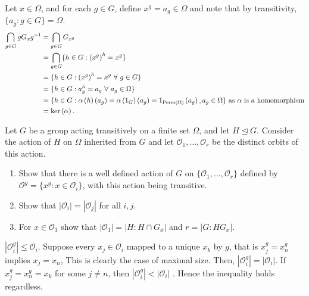 \documentclass[a4paper]{article}
\begin{document}
\begin{solution}
	Let \( x \in \Omega\), and for each \(g \in G\), define \(x^{g} = a_{g} \in \Omega\) and note that by transitivity, \(\{a_{g} : g \in G\}  = \Omega\).
\begin{align*}
\bigcap_{g \in G} gG_{x} g^{-1} &=  \bigcap_{g \in G}G_{x^{g}} \\
				&= \bigcap_{g \in G} \{h \in G : \left(x^{g} \right)^{h} = x^{g}\}   \\
				&=  \{h \in G : \left(x^{g} \right) ^{h} = x^{g} \ \forall \ g \in G\} \\
&=  \{h \in G : a_{g}^{h} = a_{g} \ \forall \ a_{g} \in \Omega\} \\
&=  \{h \in G : \alpha \left( h \right) \left( a_{g} \right)  = \alpha\left( 1_{G} \right) \left( a_{g} \right) = 1_{\perm (\Omega) } \left( a_{g} \right) , a_{g} \in \Omega \} \text{ as \(\alpha\) is a homomorphism} \\
&= \ker \left( \alpha \right)
.\end{align*}
\end{solution}
\newpage
\begin{problem}[4]
	Let \(G\) be a group acting transitively on a finite set \(\Omega\), and let \(H \trianglelefteq G\). Consider the action of \(H\) on \(\Omega\) inherited from \(G\) and let \(\mathscr{O}_1, \ldots, \mathscr{O}_{r}\) be the distinct orbits of this action.
	\begin{enumerate}
		\item Show that there is a well defined action of \(G\) on \(\{\mathscr{O}_1, \ldots, \mathscr{O}_{r}\} \) defined by \(\mathscr{O}^{g} = \{x^{g} : x \in \mathscr{O}_{i}\} \), with this action being transitive.
			\item Show that \(\left| \mathscr{O}_{i} \right| = \left| \mathscr{O}_{j} \right|  \) for all \(i, j\).
				\item For \(x \in \mathscr{O}_{1}\) show that \(\left| \mathscr{O}_{1} \right| = \left|H : H \cap G_{x}\right|\) and \(r = \left| G : HG_{x} \right| \).
	\end{enumerate}
\end{problem}
\begin{lemma}
	\(\left|\mathscr{O}_{i}^{g}\right| \le \mathscr{O}_{i} \). Suppose every \(x_{j} \in \mathscr{O}_{i}\) mapped to a unique \(x_{k}\) by \(g\), that is \(x_{j}^{g} = x_{n}^{g}\) implies \(x_{j} = x_{n}\), This is clearly the case of maximal size. Then, \(\left| \mathscr{O}_{i}^{g} \right|  = \left| \mathscr{O}_{i} \right| \). If  \(x_{j}^{g} = x_{n}^{g} =x_{k}\) for some \(j \neq n\), then \(\left| \mathscr{O}_{i}^{g}\right| < \left| \mathscr{O}_{i} \right| \) . Hence the inequality holds regardless.
\end{lemma}
\end{document}
